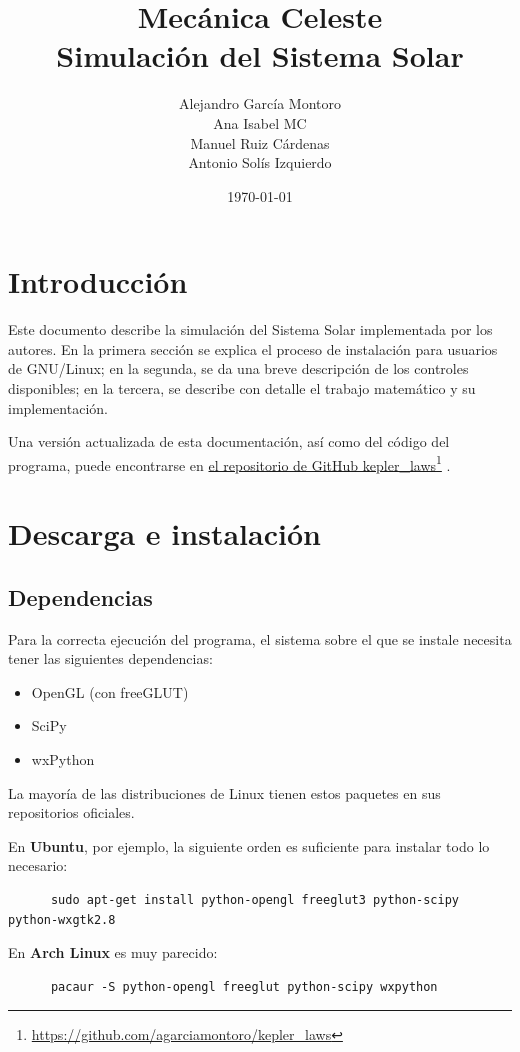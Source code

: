 \documentclass[a4paper, 11pt]{article}
\title{Mecánica Celeste \\ Simulación del Sistema Solar}
\author{Alejandro García Montoro\\
        Ana Isabel MC\\
        Manuel Ruiz Cárdenas\\
        Antonio Solís Izquierdo}
\date{\today}
\newcommand\fnurl[2]{%
  \href{#2}{#1}\footnote{\url{#2}}%
}
\begin{document}
  \maketitle

  \section{Introducción}
  Este documento describe la simulación del Sistema Solar implementada por los autores. En la primera sección se explica el proceso de instalación para usuarios de GNU/Linux; en la segunda, se da una breve descripción de los controles disponibles; en la tercera, se describe con detalle el trabajo matemático y su implementación.

  Una versión actualizada de esta documentación, así como del código del programa, puede encontrarse en \fnurl{el repositorio de GitHub kepler\_laws}{https://github.com/agarciamontoro/kepler_laws}.

  \section{Descarga e instalación}
  \subsection{Dependencias}
  Para la correcta ejecución del programa, el sistema sobre el que se instale necesita tener las siguientes dependencias:

  \begin{itemize}
      \item OpenGL (con freeGLUT)
      \item SciPy
      \item wxPython
  \end{itemize}

  La mayoría de las distribuciones de Linux tienen estos paquetes en sus repositorios oficiales.

  En \textbf{Ubuntu}, por ejemplo, la siguiente orden es suficiente para instalar todo lo necesario:

  \begin{lstlisting}
      sudo apt-get install python-opengl freeglut3 python-scipy python-wxgtk2.8
  \end{lstlisting}

  En \textbf{Arch Linux} es muy parecido:

  \begin{lstlisting}
      pacaur -S python-opengl freeglut python-scipy wxpython
  \end{lstlisting}
\end{document}
